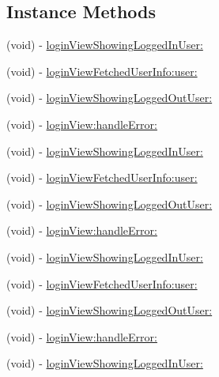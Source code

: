 \subsection*{Instance Methods}
\begin{DoxyCompactItemize}
\item 
(void) -\/ \hyperlink{protocolFBLoginViewDelegate_01-p_a1f8604ad00171b432bdb0e4582856db9}{login\+View\+Showing\+Logged\+In\+User\+:}
\item 
(void) -\/ \hyperlink{protocolFBLoginViewDelegate_01-p_a6dfcb82e159aa83b726797ec2de6877c}{login\+View\+Fetched\+User\+Info\+:user\+:}
\item 
(void) -\/ \hyperlink{protocolFBLoginViewDelegate_01-p_a39d98ab433b5919a9e1e96388bbdc691}{login\+View\+Showing\+Logged\+Out\+User\+:}
\item 
(void) -\/ \hyperlink{protocolFBLoginViewDelegate_01-p_a4cc27024e9c1fac02fbc65fd6bfba993}{login\+View\+:handle\+Error\+:}
\item 
(void) -\/ \hyperlink{protocolFBLoginViewDelegate_01-p_a1f8604ad00171b432bdb0e4582856db9}{login\+View\+Showing\+Logged\+In\+User\+:}
\item 
(void) -\/ \hyperlink{protocolFBLoginViewDelegate_01-p_a6dfcb82e159aa83b726797ec2de6877c}{login\+View\+Fetched\+User\+Info\+:user\+:}
\item 
(void) -\/ \hyperlink{protocolFBLoginViewDelegate_01-p_a39d98ab433b5919a9e1e96388bbdc691}{login\+View\+Showing\+Logged\+Out\+User\+:}
\item 
(void) -\/ \hyperlink{protocolFBLoginViewDelegate_01-p_a4cc27024e9c1fac02fbc65fd6bfba993}{login\+View\+:handle\+Error\+:}
\item 
(void) -\/ \hyperlink{protocolFBLoginViewDelegate_01-p_a1f8604ad00171b432bdb0e4582856db9}{login\+View\+Showing\+Logged\+In\+User\+:}
\item 
(void) -\/ \hyperlink{protocolFBLoginViewDelegate_01-p_a6dfcb82e159aa83b726797ec2de6877c}{login\+View\+Fetched\+User\+Info\+:user\+:}
\item 
(void) -\/ \hyperlink{protocolFBLoginViewDelegate_01-p_a39d98ab433b5919a9e1e96388bbdc691}{login\+View\+Showing\+Logged\+Out\+User\+:}
\item 
(void) -\/ \hyperlink{protocolFBLoginViewDelegate_01-p_a4cc27024e9c1fac02fbc65fd6bfba993}{login\+View\+:handle\+Error\+:}
\item 
(void) -\/ \hyperlink{protocolFBLoginViewDelegate_01-p_a1f8604ad00171b432bdb0e4582856db9}{login\+View\+Showing\+Logged\+In\+User\+:}
\item 

\end{DoxyCompactItemize}
